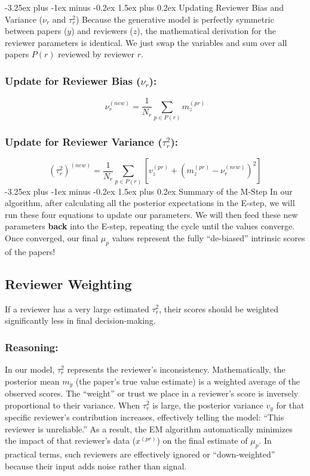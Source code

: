 \documentclass[twoside, 10pt]{article}
\makeatletter
\renewcommand{\paragraph}{\@startsection{paragraph}{4}{0pt}%
    {-3.25ex plus -1ex minus -0.2ex}%
    {1.5ex plus 0.2ex}%
    {\normalfont\normalsize\bfseries}}
\makeatother
\begin{document}
\paragraph{Updating Reviewer Bias and Variance ($\nu_r$ and $\tau_r^2$)}
Because the generative model is perfectly symmetric between papers ($y$) and reviewers ($z$), the mathematical derivation for the reviewer parameters is identical. We just swap the variables and sum over all papers $P(r)$ reviewed by reviewer $r$.
\subsubsection*{Update for Reviewer Bias ($\nu_r$):}
\[
\nu_r^{(new)} = \frac{1}{N_r} \sum_{p \in P(r)} m_z^{(pr)}
\]
\subsubsection*{Update for Reviewer Variance ($\tau_r^2$):}
\[
{(\tau_r^2)}^{(new)} = \frac{1}{N_r} \sum_{p \in P(r)} \left[ v_z^{(pr)} + {\left(m_z^{(pr)} - \nu_r^{(new)}\right)}^{2} \right]
\]
\paragraph{Summary of the M-Step}
In our algorithm, after calculating all the posterior expectations in the E-step, we will run these four equations to update our parameters. We will then feed these new parameters \textbf{back} into the E-step, repeating the cycle until the values converge. 
Once converged, our final $\mu_p$ values represent the fully ``de-biased'' intrinsic scores of the papers!
\subsection{Reviewer Weighting}
If a reviewer has a very large estimated $\tau_r^2$, their scores should be weighted significantly less in final decision-making.
\subsubsection{Reasoning:}
In our model, $\tau_r^2$ represents the reviewer's inconsistency. Mathematically, the posterior mean $m_y$ (the paper's true value estimate) is a weighted average of the observed scores. The ``weight'' or trust we place in a reviewer's score is inversely proportional to their variance.
When $\tau_r^2$ is large, the posterior variance $v_y$ for that specific reviewer's contribution increases, effectively telling the model: ``This reviewer is unreliable.'' As a result, the EM algorithm automatically minimizes the impact of that reviewer's data ($x^{(pr)}$) on the final estimate of $\mu_p$. In practical terms, such reviewers are effectively ignored or ``down-weighted'' because their input adds noise rather than signal.
\end{document}
